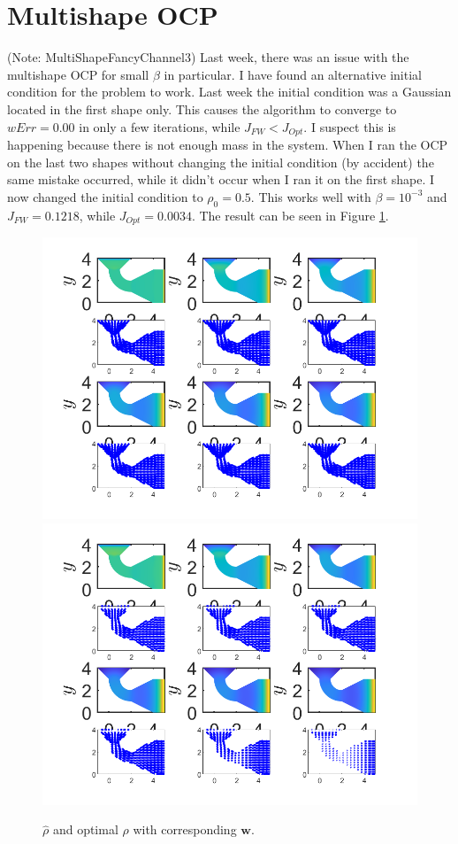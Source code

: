 \documentclass[11pt, a4paper]{article}
\theoremstyle{definition}
\newcommand{\w}{\mathbf{w}}
\newcommand{\hr}{\widehat \rho}
\begin{document}
	
	\section{Multishape OCP}
	(Note: MultiShapeFancyChannel3)
	Last week, there was an issue with the multishape OCP for small $\beta$ in particular. I have found an alternative initial condition for the problem to work. Last week the initial condition was a Gaussian located in the first shape only. This causes the algorithm to converge to $wErr = 0.00$ in only a few iterations, while $J_{FW} < J_{Opt}$. I suspect this is happening because there is not enough mass in the system. When I ran the OCP on the last two shapes without changing the initial condition (by accident) the same mistake occurred, while it didn't occur when I ran it on the first shape. 
	I now changed the initial condition to $\rho_0 = 0.5$. This works well with $\beta = 10^{-3}$ and $J_{FW} = 0.1218$, while $J_{Opt} = 0.0034$. The result can be seen in Figure \ref{F1}.
	\begin{figure}[h]
		\centering
		\includegraphics[scale=0.35]{F1.png}
		\includegraphics[scale=0.35]{F2.png}
		\caption{$\hr$ and optimal $\rho$ with corresponding $\w$.} 
		\label{F1}
	\end{figure}
   
\end{document}
